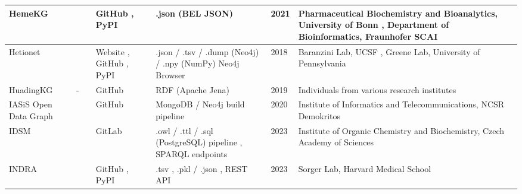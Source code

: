 \documentclass{article}
\begin{document}
\begin{landscape}
\begin{xltabular}{\textwidth}{p{3cm}|p{2.2cm}|p{2.2cm}|p{2.2cm}|p{2.2cm}|p{1cm}|p{6cm}}
\hline


HemeKG
&
\cite{hemekg_website}
&
\cite{hemekg_publication}
&
GitHub
\cite{hemekg_github},
PyPI
\cite{hemekg_pypi}
&
.json (BEL JSON)
\cite{hemekg_data}
&
2021
&
Pharmaceutical Biochemistry and Bioanalytics, University of Bonn
\cite{hemekg_group1},
Department of Bioinformatics, Fraunhofer SCAI
\cite{hemekg_group2}
\\


\hline


Hetionet
&
\cite{hetionet_website}
&
\cite{hetionet_publication1}
\cite{hetionet_publication2}
&
Website
\cite{hetionet_software},
GitHub
\cite{hetionet_github1}
\cite{hetionet_github2},
PyPI
\cite{hetionet_pypi1}
\cite{hetionet_pypi2}
&
.json / .tsv / .dump (Neo4j) / .npy (NumPy)
\cite{hetionet_data1}
Neo4j Browser
\cite{hetionet_data2}
&
2018
&
Baranzini Lab, UCSF \cite{hetionet_group2},
Greene Lab, University of Pennsylvania \cite{hetionet_group1}
\\


\hline

HuadingKG
&
-
&
\cite{huadingkg_publication}
&
GitHub
\cite{huadingkg_github}
&
RDF (Apache Jena)
\cite{huadingkg_github}
&
2019
&
Individuals from various research institutes
\\


\hline


IASiS Open Data Graph
&
\cite{iasisodg_website}
&
\cite{iasisodg_publication}
&
GitHub
\cite{iasisodg_github}
&
MongoDB / Neo4j build pipeline
\cite{iasisodg_github}
&
2020
&
Institute of Informatics and Telecommunications, NCSR Demokritos
\cite{iasisodg_group}
\\


\hline


IDSM
&
\cite{idsm_website}
&
\cite{idsm_publication}
&
GitLab
\cite{idsm_gitlab}
&
.owl / .ttl / .sql (PostgreSQL) pipeline
\cite{idsm_data1},
SPARQL endpoints
\cite{idsm_data2}
\cite{idsm_data3}
\cite{idsm_data4}
&
2023
&
Institute of Organic Chemistry and Biochemistry, Czech Academy of Sciences 
\cite{idsm_group}
\\


\hline


INDRA
&
\cite{indra_website1}
\cite{indra_website2}
&
\cite{indra_publication1}
\cite{indra_publication2}
&
GitHub
\cite{indra_github},
PyPI
\cite{indra_pypi}
&
.tsv
\cite{indra_data1},
.pkl / .json
\cite{indra_data2},
REST API
\cite{indra_data3}
&
2023
&
Sorger Lab, Harvard Medical School
\cite{indra_group}
\\



\end{xltabular}
\end{landscape}
\end{document}
